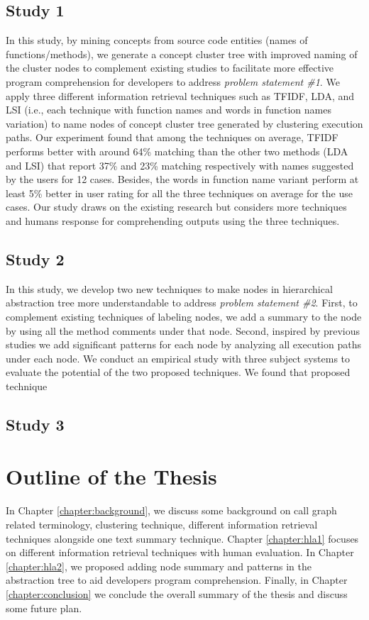 \subsection{Study 1}

In this study, by mining concepts from source code entities (names of functions/methods), we generate a concept cluster tree
with improved naming of the cluster nodes to complement existing studies to facilitate more effective program comprehension for
developers to address \emph{problem statement \#1}. We apply three different information retrieval techniques such as TFIDF, LDA, and LSI (i.e., each technique with function
names and words in function names variation) to name nodes of concept cluster tree generated by clustering execution paths. Our experiment found that among the techniques on average, TFIDF performs better with around 64\% matching than the other
two methods (LDA and LSI) that report 37\% and 23\% matching respectively with names suggested by the users for 12 cases. Besides,
the words in function name variant perform at least 5\% better in user rating for all the three techniques on average for the use cases.
Our study draws on the existing research but considers more techniques and humans response for comprehending outputs using the three
techniques.

\subsection{Study 2}

In this study, we develop two new techniques to make nodes in hierarchical abstraction tree more understandable to address \emph{problem statement \#2}. First, to complement existing techniques of labeling nodes, we add a summary to the node by using all the method comments under that node. Second, inspired by previous studies we add significant patterns for each node by analyzing all execution paths under each node. We conduct an empirical study with three subject systems to evaluate the potential of the two proposed techniques. We found that proposed technique 

\subsection{Study 3}



\section{Outline of the Thesis}
In Chapter \ref{chapter:background}, we discuss some background on call graph related terminology, clustering technique, different information retrieval techniques alongside one text summary technique. Chapter \ref{chapter:hla1} focuses on different information retrieval techniques with human evaluation. In Chapter \ref{chapter:hla2}, we proposed adding node summary and patterns in the abstraction tree to aid developers program comprehension. Finally, in Chapter \ref{chapter:conclusion} we conclude the overall summary of the thesis and discuss some future plan. 
